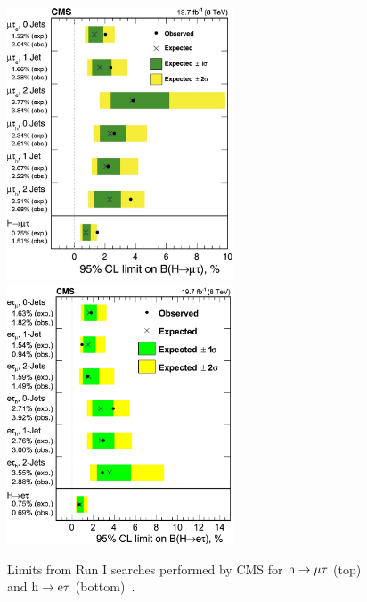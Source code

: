 \begin{figure}[hbtp]
  \begin{center}
   \captionsetup{width=.7\textwidth}
   \includegraphics[width=0.6\textwidth]{plots_and_figures/chapter2/mutau_limits.jpg}\\
   \includegraphics[width=0.6\textwidth]{plots_and_figures/chapter2/etau_limits.jpg}
   \caption{Limits from Run I searches performed by CMS for $\text{h} \to \mu \tau$ (top) and $\text{h} \to \text{e} \tau$ (bottom)~\cite{Khachatryan:2015kon,HIG-14-040}.}
   \label{fig:8tev_limits}
 \end{center}
\end{figure}


